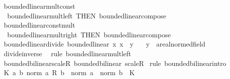 \begin{isabellebody}
\ bounded{\isacharunderscore}{\kern0pt}linear{\isacharunderscore}{\kern0pt}mult{\isacharunderscore}{\kern0pt}const\ {\isacharequal}{\kern0pt}\isanewline
\ \ bounded{\isacharunderscore}{\kern0pt}linear{\isacharunderscore}{\kern0pt}mult{\isacharunderscore}{\kern0pt}left\ {\isacharbrackleft}{\kern0pt}THEN\ bounded{\isacharunderscore}{\kern0pt}linear{\isacharunderscore}{\kern0pt}compose{\isacharbrackright}{\kern0pt}\isanewline
\isanewline
{}\isamarkupfalse%
\ bounded{\isacharunderscore}{\kern0pt}linear{\isacharunderscore}{\kern0pt}const{\isacharunderscore}{\kern0pt}mult\ {\isacharequal}{\kern0pt}\isanewline
\ \ bounded{\isacharunderscore}{\kern0pt}linear{\isacharunderscore}{\kern0pt}mult{\isacharunderscore}{\kern0pt}right\ {\isacharbrackleft}{\kern0pt}THEN\ bounded{\isacharunderscore}{\kern0pt}linear{\isacharunderscore}{\kern0pt}compose{\isacharbrackright}{\kern0pt}\isanewline
\isanewline
{}\isamarkupfalse%
\ bounded{\isacharunderscore}{\kern0pt}linear{\isacharunderscore}{\kern0pt}divide{\isacharcolon}{\kern0pt}\ {\isachardoublequoteopen}bounded{\isacharunderscore}{\kern0pt}linear\ {\isacharparenleft}{\kern0pt}{\isasymlambda}x{\isachardot}{\kern0pt}\ x\ {\isacharslash}{\kern0pt}\ y{\isacharparenright}{\kern0pt}{\isachardoublequoteclose}\isanewline
\ \ \ y\ {\isacharcolon}{\kern0pt}{\isacharcolon}{\kern0pt}\ {\isachardoublequoteopen}{\isacharprime}{\kern0pt}a{\isacharcolon}{\kern0pt}{\isacharcolon}{\kern0pt}real{\isacharunderscore}{\kern0pt}normed{\isacharunderscore}{\kern0pt}field{\isachardoublequoteclose}\isanewline
%
\isadelimproof
\ \ %
\endisadelimproof
%
\isatagproof
{}\isamarkupfalse%
\ divide{\isacharunderscore}{\kern0pt}inverse\ \isamarkupfalse%
\ {\isacharparenleft}{\kern0pt}rule\ bounded{\isacharunderscore}{\kern0pt}linear{\isacharunderscore}{\kern0pt}mult{\isacharunderscore}{\kern0pt}left{\isacharparenright}{\kern0pt}%
\endisatagproof
{\isafoldproof}%
%
\isadelimproof
\isanewline
%
\endisadelimproof
\isanewline
{}\isamarkupfalse%
\ bounded{\isacharunderscore}{\kern0pt}bilinear{\isacharunderscore}{\kern0pt}scaleR{\isacharcolon}{\kern0pt}\ {\isachardoublequoteopen}bounded{\isacharunderscore}{\kern0pt}bilinear\ scaleR{\isachardoublequoteclose}\isanewline
%
\isadelimproof
%
\endisadelimproof
%
\isatagproof
{}\isamarkupfalse%
\ {\isacharparenleft}{\kern0pt}rule\ bounded{\isacharunderscore}{\kern0pt}bilinear{\isachardot}{\kern0pt}intro{\isacharparenright}{\kern0pt}\isanewline
\ \ \isamarkupfalse%
\ {\isachardoublequoteopen}{\isasymexists}K{\isachardot}{\kern0pt}\ {\isasymforall}a\ b{\isachardot}{\kern0pt}\ norm\ {\isacharparenleft}{\kern0pt}a\ {\isacharasterisk}{\kern0pt}\isactrlsub R\ b{\isacharparenright}{\kern0pt}\ {\isasymle}\ norm\ a\ {\isacharasterisk}{\kern0pt}\ norm\ b\ {\isacharasterisk}{\kern0pt}\ K{\isachardoublequoteclose}\isanewline

\end{isabellebody}
